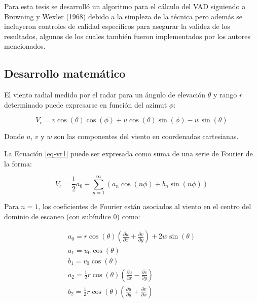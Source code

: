 \documentclass[12pt,spanish,oneside]{book}
\begin{document}
Para esta tesis se desarrolló un algoritmo para el cálculo del VAD
siguiendo a Browning y Wexler (1968) debido a la simpleza de la técnica
pero además se incluyeron controles de calidad específicos para asegurar
la validez de los resultados, algunos de los cuales también fueron
implementados por los autores mencionados.

\subsection{Desarrollo matemático}\label{desarrollo-matematico}

El viento radial medido por el radar para un ángulo de elevación
\(\theta\) y rango \(r\) determinado puede expresarse en función del
azimut \(\phi\):

\begin{equation}
\label{eq-vr1}
V_r =  v \cos(\theta) \cos(\phi) + u \cos(\theta) \sin(\phi) - w \sin(\theta)
\end{equation}

Donde \(u\), \(v\) y \(w\) son las componentes del viento en coordenadas
cartesianas.

La Ecuación \ref{eq-vr1} puede ser expresada como suma de una serie de
Fourier de la forma:

\begin{equation}
\label{eq-vr2}
V_r =  \frac{1}{2}a_0 + \sum_{n = 1}^{\infty} (a_n \cos(n\phi) + b_n \sin(n \phi)) 
\end{equation}

Para \(n=1\), los coeficientes de Fourier están asociados al viento en
el centro del dominio de escaneo (con subíndice 0) como:

\begin{equation} \label{eq-vr3}
\begin{aligned}
a_0 = r \cos(\theta)\left ( \frac{\overline{\partial u}}{\partial x} + \frac{\overline{\partial v}}{\partial y} \right) + 2 w \sin(\theta) \\
a_1 = u_0 \cos(\theta) \\
b_1 = v_0 \cos(\theta) \\
a_2 = \frac{1}{2} r \cos(\theta)\left ( \frac{\overline{\partial u}}{\partial x} - \frac{\overline{\partial v}}{\partial y} \right) \\
b_2 = \frac{1}{2} r \cos(\theta)\left ( \frac{\overline{\partial u}}{\partial y} + \frac{\overline{\partial v}}{\partial x} \right)
\end{aligned}
\end{equation}
\end{document}
